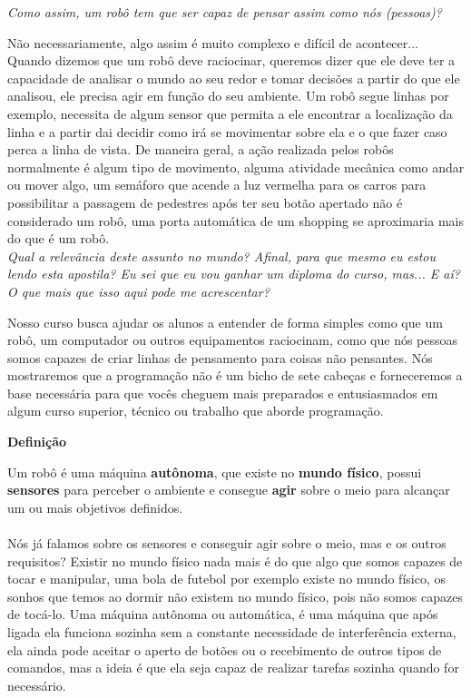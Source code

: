 \textit{Como assim, um robô tem que ser capaz de pensar assim como nós (pessoas)?} \par
Não necessariamente, algo assim é muito complexo e difícil de acontecer... Quando dizemos que um robô deve raciocinar, queremos dizer que ele deve ter a capacidade de analisar o mundo ao seu redor e tomar decisões a partir do que ele analisou, ele precisa agir em função do seu ambiente. Um robô segue linhas por exemplo, necessita de algum sensor que permita a ele encontrar a localização da linha e a partir dai decidir como irá se movimentar sobre ela e o que fazer caso perca a linha de vista. De maneira geral, a ação realizada pelos robôs normalmente é algum tipo de movimento, alguma atividade mecânica como andar ou mover algo, um semáforo que acende a luz vermelha para os carros para possibilitar a passagem de pedestres após ter seu botão apertado não é considerado um robô, uma porta automática de um shopping se aproximaria mais do que é um robô.\\

\textit{Qual a relevância deste assunto no mundo? Afinal, para que mesmo eu estou lendo esta apostila? Eu sei que eu vou ganhar um diploma do curso, mas... E aí? O que mais que isso aqui pode me acrescentar?}\par
Nosso curso busca ajudar os alunos a entender de forma simples como que um robô, um computador ou outros equipamentos raciocinam, como que nós pessoas somos capazes de criar linhas de pensamento para coisas não pensantes. Nós mostraremos que a programação não é um bicho de sete cabeças e forneceremos a base necessária para que vocês cheguem mais preparados e entusiasmados em algum curso superior, técnico ou trabalho que aborde programação.

\begin{center}

    \textbf{Definição}
    
    \justify
    Um robô é uma máquina \textbf{autônoma}, que existe no \textbf{mundo físico}, possui \textbf{sensores} para perceber o ambiente e consegue \textbf{agir} sobre o meio para alcançar um ou mais objetivos definidos.
\end{center}

\paragraph{}
Nós já falamos sobre os sensores e conseguir agir sobre o meio, mas e os outros requisitos?
Existir no mundo físico nada mais é do que algo que somos capazes de tocar e manipular, uma bola de futebol por exemplo existe no mundo físico, os sonhos que temos ao dormir não existem no mundo físico, pois não somos capazes de tocá-lo.
Uma máquina autônoma ou automática, é uma máquina que após ligada ela funciona sozinha sem a constante necessidade de interferência externa, ela ainda pode aceitar o aperto de botões ou o recebimento de outros tipos de comandos, mas a ideia é que ela seja capaz de realizar tarefas sozinha quando for necessário.

